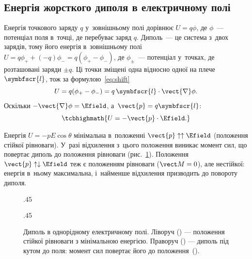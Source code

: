 \subsection*{Енергія жорсткого диполя в електричному полі}

Енергія точкового заряду $q$ у~зовнішньому полі дорівнює $U = q\phi$, де $\phi$~---
потенціал поля в~точці, де перебуває заряд $q$. Диполь~--- це система з~двох зарядів, тому
його енергія в~зовнішньому полі $U= q\phi_+ + (-q)\phi_- = q (\phi_+ - \phi_-)$, де
$\phi_\pm$~--- потенціал у~точках, де розташовані заряди $\pm q$. Ці точки зміщені одна
відносно одної на плече $\symbfscr{l}$, тож за формулою~\eqref{eq:shift}
\begin{equation*}
	U = q (\phi_+ - \phi_-) = q\, \symbfscr{l}\cdot\vect{\nabla}\phi.
\end{equation*}
Оскільки $-\vect{\nabla}\phi = \Efield$, а~$\vect{p} = q\symbfscr{l}$:
\begin{equation}\label{eq:DipoleEnergy}
	\tcbhighmath{
		U = -\vect{p}\cdot\Efield.
	}
\end{equation}

Енергія $U = -pE\cos\theta$ мінімальна в~положенні $\vect{p} \uparrow\uparrow \Efield$
(положення стійкої рівноваги). У~разі відхилення з~цього положення виникає момент сил, що
повертає диполь до положення рівноваги (рис.~\ref{tikz:angle}). Положення $\vect{p}
\uparrow\downarrow \Efield$ теж є положенням рівноваги ($\vect M = 0$), але нестійкої: енергія
в~ньому максимальна, і~найменше відхилення призводить до повороту диполя.
\begin{figure}[h!]
	\centering
	\begin{subcaptionblock}{.45\textwidth}
		\centering
		\caption{}
		\label{tikz:parallel}
	\end{subcaptionblock}
	\begin{subcaptionblock}{.45\textwidth}
		\centering
		\caption{}
		\label{tikz:angle}
	\end{subcaptionblock}
	\caption{Диполь в однорідному електричному полі. Ліворуч () --- положення стійкої рівноваги з мінімальною енергією.
		Праворуч () --- диполь під кутом до поля: момент сил повертає його до положення~().}
\end{figure}



